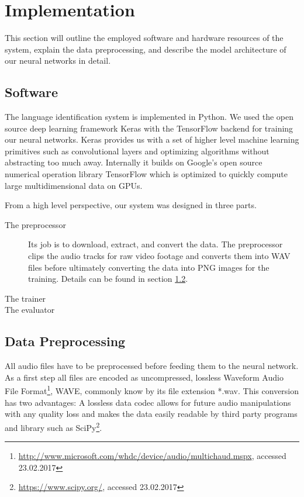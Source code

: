 \section{Implementation}
This section will outline the employed software and hardware resources of the system, explain the data preprocessing, and describe the model architecture of our neural networks in detail.

\subsection{Software}
\label{sec:software}


	The language identification system is implemented in Python. We used the open source deep learning framework Keras\cite{chollet2015keras} with the TensorFlow\cite{abadi2016tensorflow} backend for training our neural networks. Keras provides us with a set of higher level machine learning primitives such as convolutional layers and optimizing algorithms without abstracting too much away. Internally it builds on Google's open source numerical operation library TensorFlow which is optimized to quickly compute large multidimensional data on GPUs.
		
	 
	From a high level perspective, our system was designed in three parts. 
	
	\begin{description}
		\item[The preprocessor] Its job is to download, extract, and convert the data. The preprocessor clips the audio tracks for raw video footage and converts them into WAV files before ultimately converting the data into PNG images for the training. Details can be found in section \ref{sec:data_processing}.
		\item[The trainer]
		\item[The evaluator] 
	\end{description}
	

\subsection{Data Preprocessing}
\label{sec:data_processing}
All audio files have to be preprocessed before feeding them to the neural network. As a first step all files are encoded as uncompressed, lossless Waveform Audio File Format\footnote{\url{http://www.microsoft.com/whdc/device/audio/multichaud.mspx}, accessed 23.02.2017}, WAVE, commonly know by its file extension *.wav. This conversion has two advantages: A lossless data codec allows for future audio manipulations with any quality loss and makes the data easily readable by third party programs and library such as SciPy\footnote{\url{https://www.scipy.org/}, accessed 23.02.2017}. 

